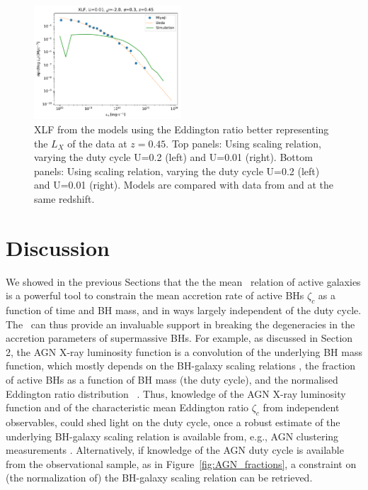 \begin{figure}
	\includegraphics[width=0.49\textwidth]{Figs/Chapter3/XLF_z0.45_mean-2.00_sigma0.30Sahu19_const0.01.pdf}
	\caption{XLF from the models using the Eddington ratio better representing the $L_X$ of the data at $z=0.45$. Top panels: Using \citet{2015ApJ...813...82R} scaling relation, varying the duty cycle U=0.2 (left) and U=0.01 (right). Bottom panels: Using \citet{2019ApJ...876..155S} scaling relation, varying the duty cycle U=0.2 (left) and U=0.01 (right). Models are compared with data from \citet{2014ApJ...786..104U} and \citet{2015ApJ...804..104M} at the same redshift.}
	\label{fig:XLF}
\end{figure}

\section{Discussion}\label{sec:disc}

We showed in the previous Sections that the the mean \LXMS\ relation of active galaxies is a powerful tool to constrain the mean accretion rate of active BHs $\zeta_c$ as a function of time and BH mass, and in ways largely independent of the duty cycle. The \LXMS\ can thus provide an invaluable support in breaking the degeneracies in the accretion parameters of supermassive BHs. 
For example, as discussed in Section 2, the AGN X-ray luminosity function is a convolution of the underlying BH mass function, which mostly depends on the BH-galaxy scaling relations \citep[e.g.,][]{Salucci99}, the fraction of active BHs as a function of BH mass (the duty cycle), and the normalised Eddington ratio distribution \PLz\ \citep[see, e.g.,][and references therein]{Shankar13Acc}. Thus, knowledge of the AGN X-ray luminosity function and of the characteristic mean Eddington ratio $\zeta_c$ from independent observables, could shed light on the duty cycle, once a robust estimate of the underlying BH-galaxy scaling relation is available from, e.g., AGN clustering measurements \citep[see discussion in][]{ShankarNat,Allevato21}. Alternatively, if knowledge of the AGN duty cycle is available from the observational sample, as in Figure~\ref{fig:AGN_fractions}, a constraint on (the normalization of) the BH-galaxy scaling relation can be retrieved.


